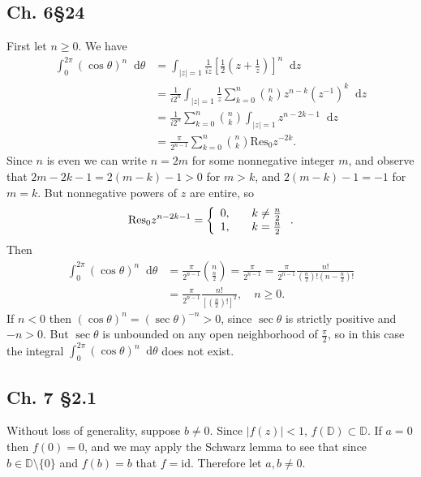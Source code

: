 \documentclass{article}
\newcommand\Res{\mathrm{Res}}
\newcommand\dif{\mathop{}\!\mathrm{d}}
\begin{document}
\subsection{Ch. 6\S 24}
First let $n \geq 0$. We have
\begin{align*}
   \int_0^{2\pi}
     (\cos \theta)^n
     \dif \theta
&= \int_{|z| = 1}
     \frac{1}{iz}
     \left[
       \frac{1}{2}
       \left(
         z + \frac{1}{z}
       \right)
     \right]^n
     \dif z \\
&= \frac{1}{i 2^n}
   \int_{|z| = 1}
     \frac{1}{z}
     \sum_{k = 0}^{n}
       {n \choose k}
       z^{n - k}
       (z^{-1})^k
     \dif z \\
&= \frac{1}{i 2^n}
   \sum_{k = 0}^n
     {n \choose k}
     \int_{|z| = 1}
       z^{n - 2k - 1}
       \dif z \\
&= \frac{\pi}{2^{n-1}}
   \sum_{k = 0}^n
     {n \choose k}
     \Res_0 z^{-2k}.
\end{align*}
Since $n$ is even we can write $n = 2m$ for some nonnegative
integer $m$, and observe that
$2m - 2k - 1 = 2(m - k) - 1 > 0$ for $m > k$, and
$2(m - k) - 1 = -1$ for $m = k$. But nonnegative powers of
$z$ are entire, so
$$
  \Res_0 z^{n - 2k - 1}
= \left\{
    \begin{array}{c c}
      0, & \quad k \neq \frac{n}{2} \\
      1, & \quad k = \frac{n}{2}
    \end{array}
  \right..
$$
Then
\begin{align*}
   \int_0^{2\pi}
     (\cos \theta)^n
     \dif \theta
&= \frac{\pi}{2^{n-1}}
     {n \choose \frac{n}{2}}
 = \frac{\pi}{2^{n-1}}
 = \frac{\pi}{2^{n-1}}
     \frac{n!}
          {\left(\frac{n}{2}\right)!
           \left(n - \frac{n}{2}\right)!} \\
&= \frac{\pi}{2^{n-1}}
     \frac{n!}
          {\left[
             \left(\frac{n}{2}\right)!
           \right]^2}
, \quad n \geq 0.
\end{align*}
If $n < 0$ then $(\cos \theta)^n = (\sec \theta)^{-n} > 0$, since
$\sec \theta$ is strictly positive and $-n > 0$. But $\sec \theta$
is unbounded on any open neighborhood of $\frac{\pi}{2}$, so in this
case the integral $\int_0^{2\pi} (\cos \theta)^n \dif \theta$ does not
exist.

\subsection{Ch. 7 \S 2.1}
Without loss of generality, suppose $b \neq 0$.
Since $|f(z)| < 1$, $f(\mathbb{D}) \subset \mathbb{D}$.
If $a = 0$ then $f(0) = 0$, and we may apply the Schwarz lemma
to see that since $b \in \mathbb{D} \setminus \{ 0 \}$ and
$f(b) = b$ that $f = \mathrm{id}$. Therefore let $a, b \neq 0$.
\end{document}
